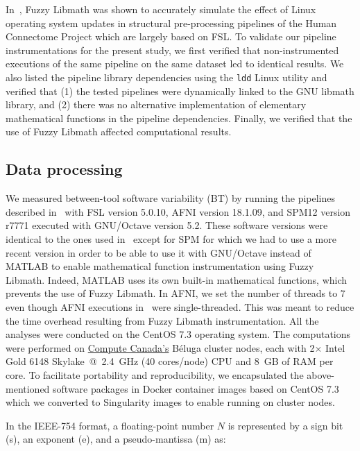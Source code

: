 In~\cite{salari2021accurate}, Fuzzy Libmath was shown to accurately
simulate the effect of Linux operating system updates in structural
pre-processing pipelines of the Human Connectome Project which are largely based on FSL.
To validate our pipeline instrumentations for the present study, we first verified that non-instrumented
executions of the same pipeline on the same dataset led to identical
results. We also listed the pipeline
library dependencies using the \texttt{ldd} Linux utility and verified that
(1) the tested pipelines were dynamically linked to the GNU libmath library, and
(2) there was no alternative implementation of elementary mathematical functions in the pipeline dependencies.
Finally, we verified that the use of Fuzzy Libmath affected computational results.
  
\subsection{Data processing}

We measured between-tool software variability (BT) by running the pipelines
described in~\cite{bowring2019exploring} with FSL version 5.0.10, AFNI
version 18.1.09, and SPM12 version r7771 executed with GNU/Octave version
5.2. These software versions were identical to the ones used 
in~\cite{bowring2019exploring} except for SPM for which we had to use
a more recent version in order to be able to use it with GNU/Octave
instead of MATLAB to enable mathematical function instrumentation using
Fuzzy Libmath. Indeed, MATLAB uses its own built-in mathematical functions,
which prevents the use of Fuzzy Libmath. In AFNI, we set the number of
threads to 7 even though AFNI executions
in~\cite{bowring2019exploring} were single-threaded. This was meant to
reduce the time overhead resulting from Fuzzy Libmath instrumentation.
All the analyses were conducted on the CentOS 7.3 operating system. The
computations were performed on \href{https://www.computecanada.ca}{Compute
  Canada's} Béluga cluster nodes, each with 2$\times$ Intel Gold 6148 Skylake~@~2.4~GHz
(40 cores/node) CPU and 8~GB of RAM per core. To facilitate portability and reproducibility,
we encapsulated the
above-mentioned software packages in Docker container images based on CentOS 7.3
which we converted to Singularity images to enable running on cluster nodes.

In the IEEE-754 format, a floating-point number $N$ is represented by a sign
bit (s), an exponent (e), and a pseudo-mantissa (m) as:

